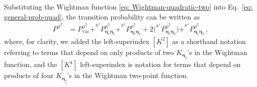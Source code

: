 \documentclass[11pt,prd,onecolumn,superscriptaddress,nofootinbib,floatfix,amsmath,amssymb]{revtex4-2}
\newcommand{\vac}{\text{vac}}
\newcommand{\bc}{{\bm{\eta}}}
\begin{document}
    Substituting the Wightman function \eqref{eq: Wightman-quadratic-two} into Eq.~\eqref{eq: general-prob-quad}, the transition probability can be written as
    \begin{align}
        P^{\phi^2} &= 
        P_{\vac}^{\phi^2} + ^{^{K^2}}\!\!\!\!P^{\phi^2}_{\bc_1\bc_1}+^{^{K^2}}\!\!\!\!P^{\phi^2}_{\bc_2\bc_2} + 2\big(\phantom{ } ^{^{K^2}}\!\!\!\!P^{\phi^2}_{\bc_1\bc_2}\big) + ^{^{K^4}}\!\!\!\!P^{\phi^2}_{\bc_1\bc_2}\,,
        \label{eq: probability-quadratic-two}
    \end{align}
    where, for clarity, we added the left-superindex $[K^2]$ as a shorthand notation referring to terms that depend on only products of two $K_{\bc_j}$'s in the Wightman function, and the $[K^4]$ left-superindex is notation for terms that depend on  products of four $K_{\bc_j}$'s in the Wightman two-point function. 
    
\end{document}
